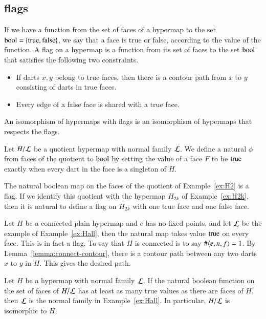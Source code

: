 \subsection{flags}

\begin{definition}  If we have a function from the set of faces of a hypermap
to the set ${\operatorname{bool}}=\{{\operatorname{true}},{\operatorname{false}}\}$, we say that a face is true or
false, according to the value of the function.  A flag on a hypermap
is a function from its set of faces to the set
${\operatorname{bool}}$ that satisfies the following two
constraints.
\begin{itemize}
    \item If darts $x,y$ belong to true faces,
    then there is a contour path from $x$ to $y$ consisting of darts
    in true faces.
    \item Every edge of a false face is shared with a true face.
    \end{itemize}
An isomorphism of hypermaps with flags is an isomorphism of
hypermaps that respects the flags.
\end{definition}

\begin{example} Let $H/{\cal L}$ be a quotient hypermap with
normal family $\cal L$.  We define
a natural $\phi$ from faces of the quotient to ${\operatorname{bool}}$ by setting
the value of a face $F$ to be ${\operatorname{true}}$ exactly when every dart in
the face is a singleton of $H$.
\end{example}

\begin{example} The natural boolean map on the faces of the
quotient of Example~\ref{ex:H2} is a flag.  If we identify this
quotient with the hypermap $H_{2k}$ of Example~\ref{ex:H2k}, 
then it is natural to define a flag
on $H_{2k}$ with one true face and one false face.
\end{example}

\begin{example} Let 
$H$ be a connected plain hypermap and $e$ has no fixed points,
and let $\cal L$ be the example of Example~\ref{ex:Hall}, 
then the natural
map takes value ${\operatorname{true}}$ on every face.  This is in fact a flag.
To say that $H$ is connected is to say $\#\langle e,n,f\rangle=1$. 
By Lemma~\ref{lemma:connect-contour}, there is a contour path between
any two darts $x$ to $y$ in $H$.  This gives the desired path.
\end{example}

\begin{lemma}\label{lemma:all-dart}  
Let $H$ be a hypermap with normal family ${\cal L}$.
If the natural boolean function on the set of faces of
$H/{\cal L}$ has at least as many
true values as there are faces of $H$, then $\cal L$ is the normal family
in Example~\ref{ex:Hall}. In particular, $H/{\cal L}$ is isomorphic to $H$.
\end{lemma}

